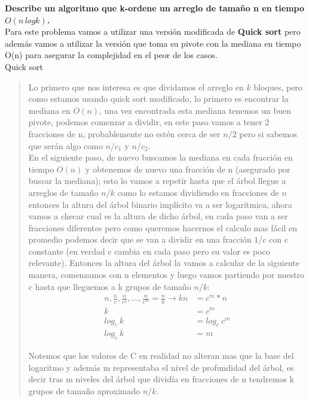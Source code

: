 \textbf{Describe un algoritmo que k-ordene un arreglo de tamaño n en tiempo $O(n \, logk)$.}\\

Para este problema vamos a utilizar una versión modificada de \textbf{Quick sort} pero además vamos a utilizar la versión que toma su pivote con la mediana en tiempo O(n) para asegurar la complejidad en el peor de los casos.\\

\textcolor{bibi}{Quick sort}
\begin{quote}
    Lo primero que nos interesa es que dividamos el arreglo en $k$ bloques, pero como estamos usando quick sort modificado, lo primero es encontrar la mediana en $O(n)$, una vez encontrada esta mediana tenemos un buen pivote, podemos comenzar a dividir, en este paso vamos a tener 2 fracciones de n, probablemente no estén cerca de ser $n/2$ pero si sabemos que serán algo como $n/c_1$ y $n/c_2$.\\

    En el siguiente paso, de nuevo buscamos la mediana en cada fracción en tiempo $O(n)$ y obtenemos de nuevo una fracción de n (asegurado por buscar la mediana); esto lo vamos a repetir hasta que el árbol llegue a arreglos de tamaño $n/k$ como lo estamos dividiendo en fracciones de $n$ entonces la altura del árbol binario implícito va a ser logarítmica, ahora vamos a checar cual es la altura de dicho árbol, en cada paso van a ser fracciones diferentes pero como queremos hacernos el calculo mas fácil en promedio podemos decir que se van a dividir en una fracción $1/c$ con c constante (en verdad c cambia en cada paso pero su valor es poco relevante). Entonces la altura del árbol la vamos a calcular de la siguiente manera, comenzamos con n elementos y luego vamos partiendo por nuestro c hasta que lleguemos a k grupos de tamaño $n/k$:
    \begin{align*}
        n, \frac{n}{c}, \frac{n}{c^2}, \dots, \frac{n}{c^m} = \frac{n}{k} \xrightarrow{} kn &= c^m * n \\
        k &= c^m \\
        log_c{\ k} &= log_c{\ c^m} \\
        log_c{\ k} &= m
    \end{align*}

    Notemos que los valores de C en realidad no alteran mas que la base del logaritmo y además m representaba el nivel de profundidad del árbol, es decir tras m niveles del árbol que dividía en fracciones de n tendremos k grupos de tamaño aproximado $n/k$.\\


\end{quote}
